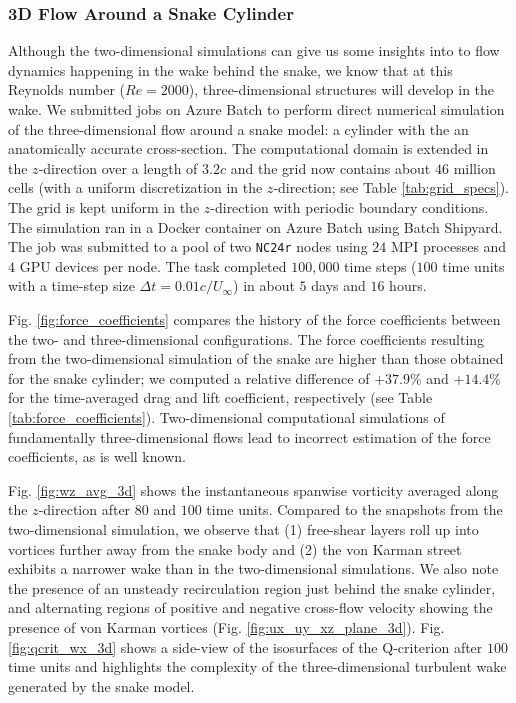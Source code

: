 \documentclass[10pt,journal,compsoc]{IEEEtran}
\begin{document}
\subsubsection{3D Flow Around a Snake Cylinder}

Although the two-dimensional simulations can give us some insights into to flow dynamics happening in the wake behind the snake, we know that at this Reynolds number ($Re = 2000$), three-dimensional structures will develop in the wake.
We submitted jobs on Azure Batch to perform direct numerical simulation of the three-dimensional flow around a snake model: a cylinder with the an anatomically accurate cross-section.
The computational domain is extended in the $z$-direction over a length of $3.2c$ and the grid now contains about $46$ million cells (with a uniform discretization in the $z$-direction; see Table \ref{tab:grid_specs}).
The grid is kept uniform in the $z$-direction with periodic boundary conditions.
The simulation ran in a Docker container on Azure Batch using Batch Shipyard.
The job was submitted to a pool of two \texttt{NC24r} nodes using $24$ MPI processes and $4$ GPU devices per node.
The task completed $100,000$ time steps ($100$ time units with a time-step size $\Delta t = 0.01 c / U_\infty$) in about $5$ days and $16$ hours.

Fig. \ref{fig:force_coefficients} compares the history of the force coefficients between the two- and three-dimensional configurations.
The force coefficients resulting from the two-dimensional simulation of the snake are higher than those obtained for the snake cylinder; we computed a relative difference of $+37.9\%$ and $+14.4\%$ for the time-averaged drag and lift coefficient, respectively (see Table \ref{tab:force_coefficients}).
Two-dimensional computational simulations of fundamentally three-dimensional flows lead to incorrect estimation of the force coefficients, as is well known\cite{mittal_balachandar_1995}.

Fig. \ref{fig:wz_avg_3d} shows the instantaneous spanwise vorticity averaged along the $z$-direction after $80$ and $100$ time units.
Compared to the snapshots from the two-dimensional simulation, we observe that (1) free-shear layers roll up into vortices further away from the snake body and (2) the von Karman street exhibits a narrower wake than in the two-dimensional simulations.
We also note the presence of an unsteady recirculation region just behind the snake cylinder, and alternating regions of positive and negative cross-flow velocity showing the presence of von Karman vortices (Fig. \ref{fig:ux_uy_xz_plane_3d}).
Fig. \ref{fig:qcrit_wx_3d} shows a side-view of the isosurfaces of the Q-criterion after $100$ time units and highlights the complexity of the three-dimensional turbulent wake generated by the snake model.
\end{document}
